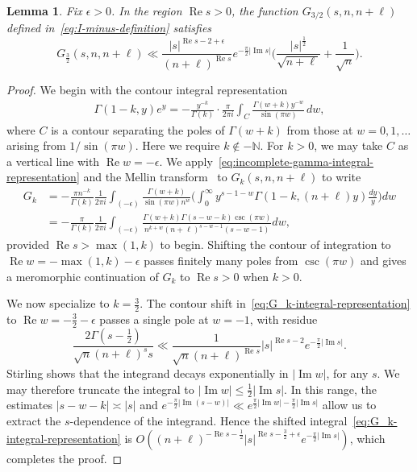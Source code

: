 \documentclass[11pt,reqno]{amsart}
\theoremstyle{plain}
\newtheorem{lemma}[theorem]{Lemma}
\theoremstyle{definition}
\numberwithin{equation}{section}
\renewcommand{\Im}{\operatorname{Im}}
\renewcommand{\Re}{\operatorname{Re}}
\begin{document}
\begin{lemma} \label{lem:G_k-growth}
Fix $\epsilon > 0$. In the region $\Re s > 0$, the function $G_{3/2}(s,n,n+\ell)$ defined in~\eqref{eq:I-minus-definition} satisfies
\[
	G_{\frac{3}{2}}(s, n,n+\ell) \ll
	\frac{\vert s \vert^{\Re s - 2 + \epsilon}}{(n+\ell)^{\Re s}}
	e^{-\frac{\pi}{2} \vert \Im s \vert} \Big(\frac{\vert s \vert^{\frac{1}{2}}}{\sqrt{n+\ell}} + \frac{1}{\sqrt{n}} \Big).
\]
\end{lemma}

\begin{proof} We begin with the contour integral representation~\cite[(8.6.12)]{DLMF}
\begin{align} \label{eq:incomplete-gamma-integral-representation}
	\Gamma(1-k, y) e^y =
		- \frac{y^{-k}}{\Gamma(k)} \cdot \frac{\pi}{2\pi i}
		\int_C \frac{\Gamma(w+k) y^{-w}}{\sin(\pi w)} \,dw,
\end{align}
where $C$ is a contour separating the poles of $\Gamma(w+k)$ from those at $w=0,1,\ldots$ arising from $1/\sin(\pi w)$. Here we require $k \notin -\mathbb{N}$. For $k> 0$, we may take $C$ as a vertical line with $\Re w = - \epsilon$. We apply~\eqref{eq:incomplete-gamma-integral-representation} and the Mellin transform~\cite[(8.14.4)]{DLMF} to $G_k(s,n,n+\ell)$ to write
\begin{align} 
	G_k &= -\frac{\pi n^{-k}}{\Gamma(k)} \frac{1}{2\pi i} \int_{(-\epsilon)}
		\frac{\Gamma(w+k)}{\sin(\pi w) n^{w}}
			\Big(\int_0^\infty y^{s-1-w} \Gamma(1-k, (n+\ell)y) \frac{dy}{y}\Big)  dw \\
			\label{eq:G_k-integral-representation}
	&=
		-\frac{\pi}{\Gamma(k)} \frac{1}{2\pi i} \int_{(-\epsilon)}
			\frac{\Gamma(w+k)\Gamma(s-w-k) \csc(\pi w)}{ n^{k+w} (n+\ell)^{s-w-1} (s-w-1)} dw,
\end{align}
provided $\Re s > \max(1,k)$ to begin. Shifting the contour of integration to $\Re w = - \max(1,k) - \epsilon$ passes finitely many poles from $\csc(\pi w)$ and gives a meromorphic continuation of $G_k$ to $\Re s > 0$ when $k>0$.

We now specialize to $k=\frac{3}{2}$. The contour shift in~\eqref{eq:G_k-integral-representation} to $\Re w = -\frac{3}{2} - \epsilon$ passes a single pole at $w=-1$, with residue 
\[
	\frac{2 \Gamma(s-\frac{1}{2})}{\sqrt{n} (n+\ell)^s s} 
	\ll \frac{1}{\sqrt{n} (n+ \ell)^{\Re s }} \vert s \vert^{\Re s -2} e^{-\frac{\pi}{2} \vert \Im s \vert}.
\]
Stirling shows that the integrand decays exponentially in $\vert \Im w \vert$, for any $s$. We may therefore truncate the integral to $\vert \Im w \vert \leq \frac{1}{2} \vert \Im s \vert$. In this range, the estimates $\vert s - w - k \vert \asymp \vert s \vert$ and $e^{-\frac{\pi}{2} \vert \Im (s-w) \vert} \ll e^{\frac{\pi}{2} \vert \Im w \vert - \frac{\pi}{2} \vert \Im s \vert}$ allow us to extract the $s$-dependence of the integrand. Hence the shifted integral~\eqref{eq:G_k-integral-representation} is $O( (n+\ell)^{-\Re s - \frac{1}{2}} \vert s \vert^{\Re s - \frac{3}{2}+\epsilon} e^{-\frac{\pi}{2} \vert \Im s \vert})$, which completes the proof.
\end{proof}
\end{document}
